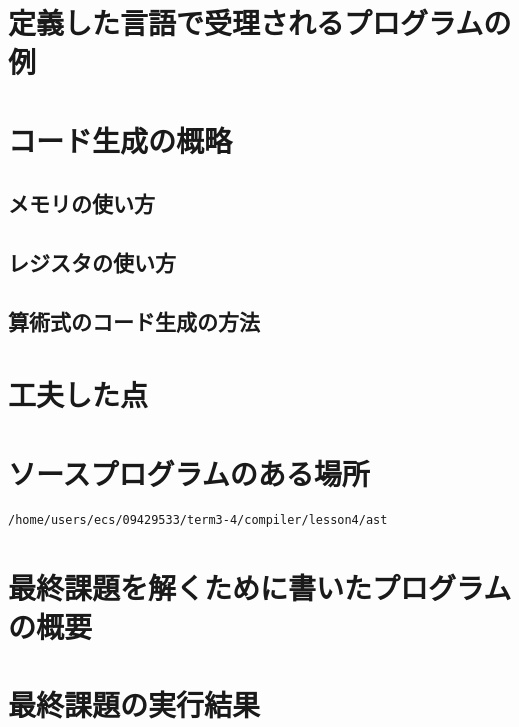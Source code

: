 \documentclass{jarticle}[11pt]
\begin{document}
\section{定義した言語で受理されるプログラムの例}



\section{コード生成の概略}
\subsection{メモリの使い方}
\subsection{レジスタの使い方}
\subsection{算術式のコード生成の方法}
\section{工夫した点}
\section{ソースプログラムのある場所}
\begin{verbatim}
/home/users/ecs/09429533/term3-4/compiler/lesson4/ast
\end{verbatim}
\section{最終課題を解くために書いたプログラムの概要}
\section{最終課題の実行結果}
\end{document}
